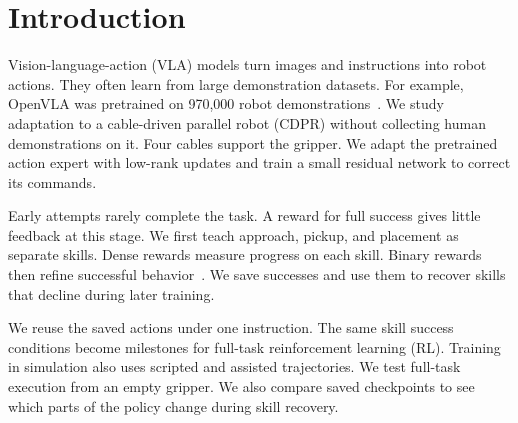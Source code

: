 \section{Introduction}\label{sec:introduction}
Vision-language-action (VLA) models turn images and instructions into robot actions. They often learn from large demonstration datasets. For example, OpenVLA was pretrained on 970,000 robot demonstrations~\cite{openvla}. We study adaptation to a cable-driven parallel robot (CDPR) without collecting human demonstrations on it. Four cables support the gripper. We adapt the pretrained action expert with low-rank updates and train a small residual network to correct its commands.

Early attempts rarely complete the task. A reward for full success gives little feedback at this stage. We first teach approach, pickup, and placement as separate skills. Dense rewards measure progress on each skill. Binary rewards then refine successful behavior~\cite{simplevlarl}. We save successes and use them to recover skills that decline during later training.

We reuse the saved actions under one instruction. The same skill success conditions become milestones for full-task reinforcement learning (RL). Training in simulation also uses scripted and assisted trajectories. We test full-task execution from an empty gripper. We also compare saved checkpoints to see which parts of the policy change during skill recovery.
